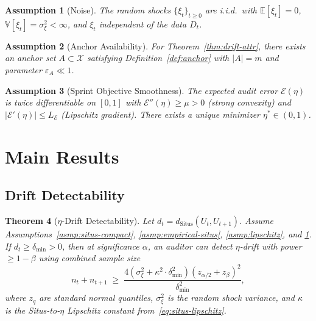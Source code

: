 \documentclass[12pt,a4paper]{article}
\newtheorem{theorem}{Theorem}[section]
\newtheorem{assumption}[theorem]{Assumption}
\newcommand{\E}{\mathbb{E}}
\newcommand{\V}{\mathbb{V}}
\newcommand{\cX}{\mathcal{X}}
\newcommand{\Situs}{\mathrm{Situs}}
\begin{document}
\begin{assumption}[Noise]
\label{asmp:noise}
The random shocks $\{\xi_t\}_{t \ge 0}$ are i.i.d.\ with
$\E[\xi_t] = 0$, $\V[\xi_t] = \sigma_\xi^2 < \infty$, and
$\xi_t$ independent of the data $D_t$.
\end{assumption}

\begin{assumption}[Anchor Availability]
\label{asmp:anchor}
For Theorem~\ref{thm:drift-attr}, there exists an anchor set
$A \subset \cX$ satisfying Definition~\ref{def:anchor} with
$|A| = m$ and parameter $\varepsilon_A \ll 1$.
\end{assumption}

\begin{assumption}[Sprint Objective Smoothness]
\label{asmp:sprint-smooth}
The expected audit error $\mathcal{E}(\eta)$ is twice differentiable
on $[0,1]$ with $\mathcal{E}''(\eta) \ge \mu > 0$ (strong convexity)
and $|\mathcal{E}'(\eta)| \le L_{\mathcal{E}}$ (Lipschitz gradient).
There exists a unique minimizer $\eta^* \in (0,1)$.
\end{assumption}

\section{Main Results}

\subsection{Drift Detectability}
\label{sec:drift-detect}

\begin{theorem}[$\eta$-Drift Detectability]
\label{thm:drift-detect}
Let $d_t = d_{\Situs}(U_t, U_{t+1})$.  Assume
Assumptions~\ref{asmp:situs-compact}, \ref{asmp:empirical-situs},
\ref{asmp:lipschitz}, and \ref{asmp:noise}.  If $d_t \geq \delta_{\min} > 0$,
then at significance $\alpha$, an auditor can detect $\eta$-drift with
power $\geq 1-\beta$ using combined sample size
\begin{equation}\label{eq:drift-sample-size}
    n_t + n_{t+1} \;\geq\;
    \frac{4(\sigma^2_\xi + \kappa^2 \cdot \delta^2_{\min})
          (z_{\alpha/2} + z_\beta)^2}
         {\delta^2_{\min}},
\end{equation}
where $z_q$ are standard normal quantiles, $\sigma^2_\xi$ is the random
shock variance, and $\kappa$ is the Situs-to-$\eta$ Lipschitz constant
from~\eqref{eq:situs-lipschitz}.
\end{theorem}
\end{document}
